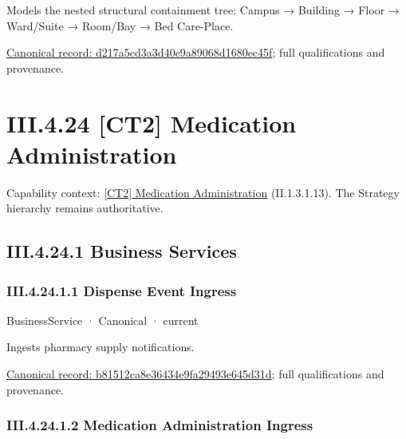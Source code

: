Models the nested structural containment tree: Campus → Building → Floor → Ward/Suite → Room/Bay → Bed Care-Place.


{\footnotesize \href{../../../../continuum/business/business-function/d217a5cd3a3d40e9a89068d1680ec45f.md}{Canonical record: d217a5cd3a3d40e9a89068d1680ec45f}; full qualifications and provenance.}\par
\section*{III.4.24 [CT2] Medication Administration}
\label{navigation:III.4.24}

{\small Capability context: \hyperref[element:c907e2a95629435b9951941ad4e2ebe9]{[CT2] Medication Administration} (II.1.3.1.13). The Strategy hierarchy remains authoritative.}\par
\subsection*{III.4.24.1 Business Services}
\label{navigation:III.4.24.1}

\subsubsection*{III.4.24.1.1 Dispense Event Ingress}
\label{navigation:III.4.24.1.1}

\label{element:b81512ca8e36434e9fa29493e645d31d}
{\small BusinessService · Canonical · current}\par

Ingests pharmacy supply notifications.


{\footnotesize \href{../../../../continuum/business/business-service/b81512ca8e36434e9fa29493e645d31d.md}{Canonical record: b81512ca8e36434e9fa29493e645d31d}; full qualifications and provenance.}\par
\subsubsection*{III.4.24.1.2 Medication Administration Ingress}
\label{navigation:III.4.24.1.2}

